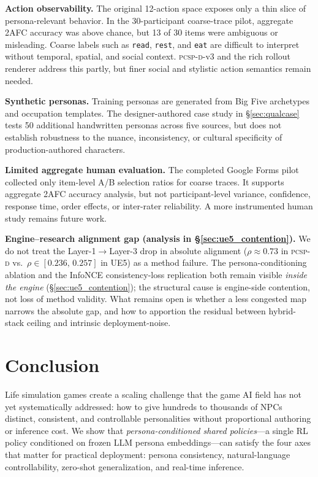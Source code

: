\documentclass[conference]{IEEEtran}
\newcommand{\PCSPD}{\textsc{pcsp-d}\xspace}
\begin{document}
\textbf{Action observability.}
The original 12-action space exposes only a thin slice of persona-relevant
behavior. In the 30-participant coarse-trace pilot, aggregate 2AFC accuracy was
above chance, but 13 of 30 items were ambiguous or misleading. Coarse labels
such as \texttt{read}, \texttt{rest}, and \texttt{eat} are difficult to
interpret without temporal, spatial, and social context. \PCSPD-v3 and the
rich rollout renderer address this partly, but finer social and stylistic
action semantics remain needed.

\textbf{Synthetic personas.}
Training personas are generated from Big Five archetypes and occupation
templates. The designer-authored case study in \S\ref{sec:qualcase} tests 50
additional handwritten personas across five sources, but does not establish
robustness to the nuance, inconsistency, or cultural specificity of
production-authored characters.

\textbf{Limited aggregate human evaluation.}
The completed Google Forms pilot collected only item-level A/B selection ratios
for coarse traces. It supports aggregate 2AFC accuracy analysis, but not
participant-level variance, confidence, response time, order effects, or
inter-rater reliability. A more instrumented human study remains future work.

\textbf{Engine--research alignment gap (analysis in
\S\ref{sec:ue5_contention}).}
We do not treat the Layer-1$\to$Layer-3 drop in absolute alignment
($\rho \approx 0.73$ in \PCSPD{} vs.\ $\rho \in [0.236,\,0.257]$ in UE5) as a
method failure. The persona-conditioning ablation and the InfoNCE
consistency-loss replication both remain visible \emph{inside the engine}
(\S\ref{sec:ue5_contention}); the structural cause is engine-side contention,
not loss of method validity. What remains open is whether a less congested
map narrows the absolute gap, and how to apportion the residual between
hybrid-stack ceiling and intrinsic deployment-noise.

\section{Conclusion}
\label{sec:conclusion}

Life simulation games create a scaling challenge that the game AI field has not
yet systematically addressed: how to give hundreds to thousands of NPCs distinct,
consistent, and controllable personalities without proportional authoring or
inference cost. We show that \emph{persona-conditioned shared
policies}---a single RL policy conditioned on frozen LLM persona
embeddings---can satisfy the four axes that matter for practical deployment:
persona consistency, natural-language controllability, zero-shot
generalization, and real-time inference.
\end{document}
